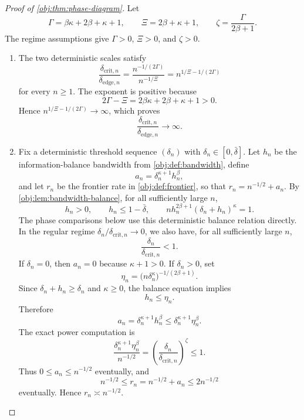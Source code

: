 \documentclass[11pt]{article}
\begin{document}
\begin{proof}[Proof of \cref{obj:thm:phase-diagram}]
Let
\[
\Gamma=\beta\kappa+2\beta+\kappa+1,
\qquad
\Xi=2\beta+\kappa+1,
\qquad
\zeta=\frac{\Gamma}{2\beta+1}.
\]
The regime assumptions give \(\Gamma>0\), \(\Xi>0\), and \(\zeta>0\).

\begin{enumerate}
\item The two deterministic scales satisfy
\[
\frac{\delta_{\mathrm{crit},n}}{\delta_{\mathrm{edge},n}}
=
\frac{n^{-1/(2\Gamma)}}{n^{-1/\Xi}}
=
n^{1/\Xi-1/(2\Gamma)}
\]
for every \(n\ge1\).  The exponent is positive because
\[
2\Gamma-\Xi
=
2\beta\kappa+2\beta+\kappa+1>0.
\]
Hence \(n^{1/\Xi-1/(2\Gamma)}\to\infty\), which proves
\[
\frac{\delta_{\mathrm{crit},n}}{\delta_{\mathrm{edge},n}}\to\infty .
\]

\item Fix a deterministic threshold sequence \((\delta_n)\) with
\(\delta_n\in[0,\bar\delta]\).  Let \(h_n\) be the information-balance bandwidth
from \cref{obj:def:bandwidth}, define
\[
a_n=\delta_n^{\kappa+1}h_n^\beta,
\]
and let \(r_n\) be the frontier rate in \cref{obj:def:frontier}, so that
\(r_n=n^{-1/2}+a_n\).  By \cref{obj:lem:bandwidth-balance}, for all sufficiently
large \(n\),
\[
h_n>0,
\qquad
h_n\le 1-\bar\delta,
\qquad
n h_n^{2\beta+1}(\delta_n+h_n)^\kappa=1 .
\]
The phase comparisons below use this deterministic balance relation directly.
In the regular regime \(\delta_n/\delta_{\mathrm{crit},n}\to0\), we also have,
for all sufficiently large \(n\),
\[
\frac{\delta_n}{\delta_{\mathrm{crit},n}}<1 .
\]
If \(\delta_n=0\), then \(a_n=0\) because \(\kappa+1>0\).  If \(\delta_n>0\), set
\[
\eta_n=\bigl(n\delta_n^\kappa\bigr)^{-1/(2\beta+1)} .
\]
Since \(\delta_n+h_n\ge\delta_n\) and \(\kappa\ge0\), the balance equation implies
\[
h_n\le \eta_n .
\]
Therefore
\[
a_n
=
\delta_n^{\kappa+1}h_n^\beta
\le
\delta_n^{\kappa+1}\eta_n^\beta .
\]
The exact power computation is
\[
\frac{\delta_n^{\kappa+1}\eta_n^\beta}{n^{-1/2}}
=
\left(\frac{\delta_n}{\delta_{\mathrm{crit},n}}\right)^\zeta
\le 1 .
\]
Thus \(0\le a_n\le n^{-1/2}\) eventually, and
\[
n^{-1/2}\le r_n=n^{-1/2}+a_n\le 2n^{-1/2}
\]
eventually.  Hence \(r_n\asymp n^{-1/2}\).


\end{enumerate}
\end{proof}
\end{document}
